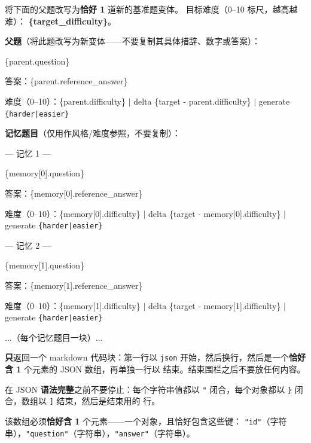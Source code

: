 \begin{center}
\begin{tcolorbox}[
    title={改写器提示模板},
    label={box:proposer_prompt},
    width=\linewidth,
    colback=white,
    colframe=black,
    boxrule=0.5pt,
    left=6pt,
    right=6pt,
    top=6pt,
    bottom=6pt,
    fonttitle=\bfseries,
    fontupper=\ttfamily\small,
]

将下面的父题改写为\textbf{恰好 1} 道新的基准题变体。
目标难度（0--10 标尺，越高越难）：
\textbf{\{target\_difficulty\}}。

\medskip
\textbf{父题}（将此题改写为新变体——不要复制其具体措辞、数字或答案）：

\{parent.question\}

答案：\{parent.reference\_answer\}

难度（0--10）：\{parent.difficulty\} $|$ delta \{target - parent.difficulty\} $|$ generate \texttt{\{harder|easier\}}

\medskip
\textbf{记忆题目}（仅用作风格/难度参照，不要复制）：

\medskip
--- 记忆 1 ---

\{memory[0].question\}

答案：\{memory[0].reference\_answer\}

难度（0--10）：\{memory[0].difficulty\} $|$ delta \{target - memory[0].difficulty\} $|$ generate \texttt{\{harder|easier\}}

\medskip
--- 记忆 2 ---

\{memory[1].question\}

答案：\{memory[1].reference\_answer\}

难度（0--10）：\{memory[1].difficulty\} $|$ delta \{target - memory[1].difficulty\} $|$ generate \texttt{\{harder|easier\}}

\medskip
...（每个记忆题目一块）...

\medskip
\textbf{只}返回一个 markdown 代码块：第一行以 \texttt{\textasciigrave\textasciigrave\textasciigrave{}json} 开始，然后换行，然后是一个\textbf{恰好含 1} 个元素的 JSON 数组，再单独一行以 \texttt{\textasciigrave\textasciigrave\textasciigrave} 结束。结束围栏之后不要放任何内容。

\medskip
在 JSON \textbf{语法完整}之前不要停止：每个字符串值都以 \texttt{"} 闭合，每个对象都以 \texttt{\}} 闭合，数组以 \texttt{]} 结束，然后是结束用的 \texttt{\textasciigrave\textasciigrave\textasciigrave} 行。

\medskip
该数组必须\textbf{恰好含 1} 个元素——一个对象，且恰好包含这些键：
\texttt{"id"}（字符串），\texttt{"question"}（字符串），\texttt{"answer"}（字符串）。

\end{tcolorbox}
\end{center}

